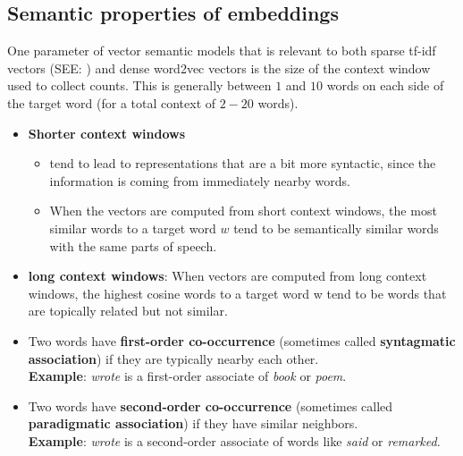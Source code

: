 \subsection{Semantic properties of embeddings \cite{nlp-1}}
One parameter of vector semantic models that is relevant to both sparse tf-idf vectors (SEE: ) and dense word2vec vectors is the size of the context window used to collect counts. This is generally between $1$ and $10$ words on each side of the target word (for a total context of $2-20$ words).
\begin{itemize}
    \item \textbf{Shorter context windows}
    \begin{itemize}
        \item tend to lead to representations that are a bit more syntactic, since the information is coming from immediately nearby words.
        \item When the vectors are computed from short context windows, the most similar words to a target word $w$ tend to be semantically similar words with the same parts of speech.
    \end{itemize}

    \item \textbf{long context windows}: When vectors are computed from long context windows, the highest cosine words to a target word w tend to be words that are topically related but not similar.

    \item Two words have \textbf{first-order co-occurrence} (sometimes called \textbf{syntagmatic association}) if they are typically nearby each other.\\
    \textbf{Example}: \textit{wrote} is a first-order associate of \textit{book} or \textit{poem}.

    \item Two words have \textbf{second-order co-occurrence}  (sometimes called \textbf{paradigmatic association}) if they have similar neighbors.\\
    \textbf{Example}: \textit{wrote} is a second-order associate of words like \textit{said} or \textit{remarked}.

\end{itemize}

